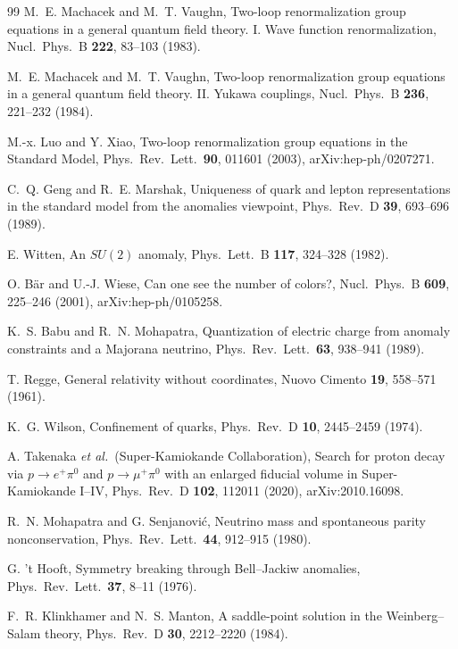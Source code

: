 \documentclass[aps,pra,onecolumn,superscriptaddress,nofootinbib,10pt]{revtex4-2}
\theoremstyle{definition}
\theoremstyle{remark}
\begin{document}
\begin{thebibliography}{99}
 M.~E. Machacek and M.~T. Vaughn, Two-loop renormalization group equations in a general quantum field theory. I. Wave function renormalization, Nucl.\ Phys.\ B \textbf{222}, 83--103 (1983).

 M.~E. Machacek and M.~T. Vaughn, Two-loop renormalization group equations in a general quantum field theory. II. Yukawa couplings, Nucl.\ Phys.\ B \textbf{236}, 221--232 (1984).

 M.-x. Luo and Y. Xiao, Two-loop renormalization group equations in the Standard Model, Phys.\ Rev.\ Lett.\ \textbf{90}, 011601 (2003), arXiv:hep-ph/0207271.

 C.~Q. Geng and R.~E. Marshak, Uniqueness of quark and lepton representations in the standard model from the anomalies viewpoint, Phys.\ Rev.\ D \textbf{39}, 693--696 (1989).

 E. Witten, An $SU(2)$ anomaly, Phys.\ Lett.\ B \textbf{117}, 324--328 (1982).

 O. B\"ar and U.-J. Wiese, Can one see the number of colors?, Nucl.\ Phys.\ B \textbf{609}, 225--246 (2001), arXiv:hep-ph/0105258.

 K.~S. Babu and R.~N. Mohapatra, Quantization of electric charge from anomaly constraints and a Majorana neutrino, Phys.\ Rev.\ Lett.\ \textbf{63}, 938--941 (1989).

 T. Regge, General relativity without coordinates, Nuovo Cimento \textbf{19}, 558--571 (1961).

 K.~G. Wilson, Confinement of quarks, Phys.\ Rev.\ D \textbf{10}, 2445--2459 (1974).

 A. Takenaka \emph{et al.}\ (Super-Kamiokande Collaboration), Search for proton decay via $p\to e^+\pi^0$ and $p\to\mu^+\pi^0$ with an enlarged fiducial volume in Super-Kamiokande I--IV, Phys.\ Rev.\ D \textbf{102}, 112011 (2020), arXiv:2010.16098.

 R.~N. Mohapatra and G. Senjanovi\'c, Neutrino mass and spontaneous parity nonconservation, Phys.\ Rev.\ Lett.\ \textbf{44}, 912--915 (1980).

 G. 't Hooft, Symmetry breaking through Bell--Jackiw anomalies, Phys.\ Rev.\ Lett.\ \textbf{37}, 8--11 (1976).

 F.~R. Klinkhamer and N.~S. Manton, A saddle-point solution in the Weinberg--Salam theory, Phys.\ Rev.\ D \textbf{30}, 2212--2220 (1984).


\end{thebibliography}
\end{document}

